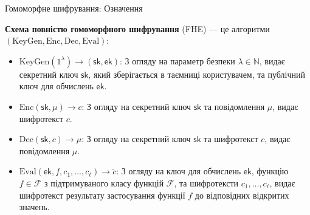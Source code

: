 \documentclass{zkdl-presentation-template}
\begin{document}
    \begin{frame}{Гомоморфне шифрування: Означення}
        \begin{definition} \textbf{Схема
        повністю гомоморфного шифрування} (FHE) — це алгоритми
        $(\mathrm{KeyGen}, \mathrm{Enc}, \mathrm{Dec}, \mathrm{Eval})$: 
        \begin{itemize} 
            \item $\mathrm{KeyGen}(1^{\lambda}) \to
        (\mathsf{sk},\mathsf{ek})$: З огляду на параметр безпеки $\lambda \in
        \mathbb{N}$, видає секретний ключ $\mathsf{sk}$, який зберігається в
        таємниці користувачем, та публічний ключ для обчислень $\mathsf{ek}$.
            \item $\mathrm{Enc}(\mathsf{sk},\mu) \to c$: З огляду на секретний
            ключ $\mathsf{sk}$ та повідомлення $\mu$, видає шифротекст $c$.
            \item $\mathrm{Dec}(\mathsf{sk},c) \to \mu$: З огляду на секретний
            ключ $\mathsf{sk}$ та шифротекст $c$, видає повідомлення $\mu$.
            \item $\mathrm{Eval}(\mathsf{ek},f,c_1,\ldots,c_{\ell}) \to
            \widetilde{c}$: З огляду на ключ для обчислень $\mathsf{ek}$,
            функцію $f \in \mathcal{F}$ з підтримуваного класу функцій
            $\mathcal{F}$, та шифротексти $c_1,\ldots,c_{\ell}$, видає
            шифротекст результату застосування функції $f$ до відповідних
            відкритих значень.
        \end{itemize} 
    \end{definition}
    \end{frame}
\end{document}
